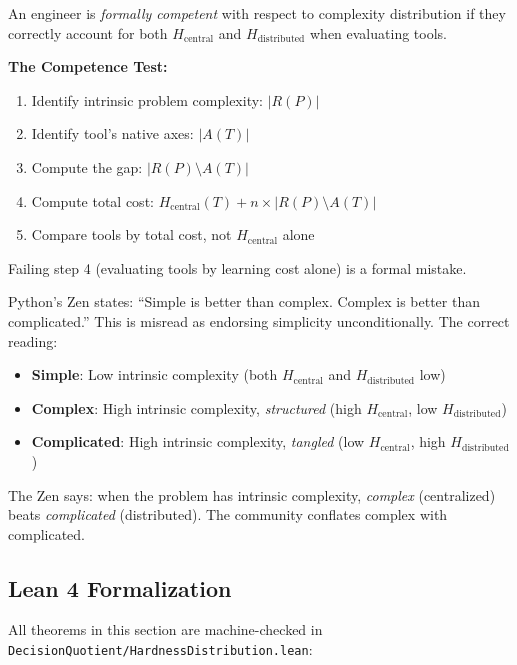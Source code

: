 \begin{definition}
An engineer is \emph{formally competent} with respect to complexity distribution if they correctly account for both $H_{\text{central}}$ and $H_{\text{distributed}}$ when evaluating tools.
\end{definition}

\textbf{The Competence Test:}
\begin{enumerate}
\item Identify intrinsic problem complexity: $|R(P)|$
\item Identify tool's native axes: $|A(T)|$
\item Compute the gap: $|R(P) \setminus A(T)|$
\item Compute total cost: $H_{\text{central}}(T) + n \times |R(P) \setminus A(T)|$
\item Compare tools by total cost, not $H_{\text{central}}$ alone
\end{enumerate}

Failing step 4 (evaluating tools by learning cost alone) is a formal mistake.

\begin{remark}
Python's Zen states: ``Simple is better than complex. Complex is better than complicated.'' This is misread as endorsing simplicity unconditionally. The correct reading:
\begin{itemize}
\item \textbf{Simple}: Low intrinsic complexity (both $H_{\text{central}}$ and $H_{\text{distributed}}$ low)
\item \textbf{Complex}: High intrinsic complexity, \emph{structured} (high $H_{\text{central}}$, low $H_{\text{distributed}}$)
\item \textbf{Complicated}: High intrinsic complexity, \emph{tangled} (low $H_{\text{central}}$, high $H_{\text{distributed}}$)
\end{itemize}
The Zen says: when the problem has intrinsic complexity, \emph{complex} (centralized) beats \emph{complicated} (distributed). The community conflates complex with complicated.
\end{remark}

\subsection{Lean 4 Formalization}\label{sec:simplicity-lean}

All theorems in this section are machine-checked in \texttt{DecisionQuotient/HardnessDistribution.lean}:

